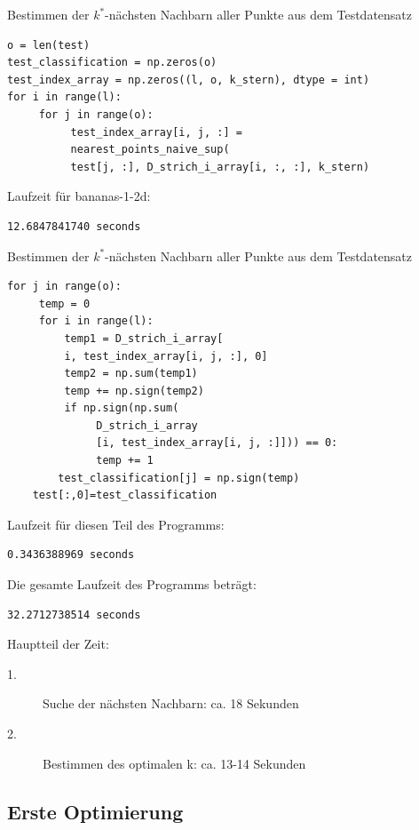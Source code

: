 \documentclass{beamer}
\begin{document}
\begin{frame}[fragile]
Bestimmen der $k^*$-nächsten Nachbarn aller Punkte aus dem Testdatensatz
\begin{verbatim}
o = len(test)
test_classification = np.zeros(o)
test_index_array = np.zeros((l, o, k_stern), dtype = int)
for i in range(l):
     for j in range(o):
          test_index_array[i, j, :] =
          nearest_points_naive_sup(
          test[j, :], D_strich_i_array[i, :, :], k_stern)
\end{verbatim}
Laufzeit für bananas-1-2d:
\begin{verbatim}
12.6847841740 seconds
\end{verbatim}
\end{frame}

\begin{frame}[fragile]
Bestimmen der $k^*$-nächsten Nachbarn aller Punkte aus dem Testdatensatz
\begin{verbatim}
for j in range(o):
     temp = 0
     for i in range(l):
         temp1 = D_strich_i_array[
         i, test_index_array[i, j, :], 0]
         temp2 = np.sum(temp1)
         temp += np.sign(temp2)
         if np.sign(np.sum(
              D_strich_i_array
              [i, test_index_array[i, j, :]])) == 0:
              temp += 1
        test_classification[j] = np.sign(temp)
    test[:,0]=test_classification
\end{verbatim}
\end{frame}

\begin{frame}[fragile]
Laufzeit für diesen Teil des Programms:
\begin{verbatim}
0.3436388969 seconds
\end{verbatim}
Die gesamte Laufzeit des Programms beträgt:
\begin{verbatim}
32.2712738514 seconds
\end{verbatim}
Hauptteil der Zeit:
\begin{description}
\item[1.] Suche der nächsten Nachbarn: ca. 18 Sekunden
\item[2.] Bestimmen des optimalen k: ca. 13-14 Sekunden
\end{description}
\end{frame}


\subsection{Erste Optimierung}
\end{document}
